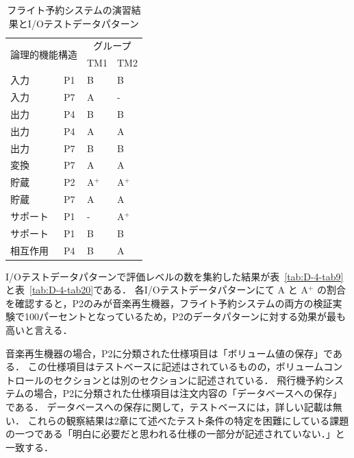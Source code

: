 \begin{table}[htbp]
\centering
  \caption{フライト予約システムの演習結果とI/Oテストデータパターン}
    \begin{tabular}{|l|l|l|l|}
    \hline
    \multicolumn{2}{|c|}{\multirow{2}[4]{*}{論理的機能構造}} & \multicolumn{2}{c|}{グループ} \bigstrut\\
\cline{3-4}    \multicolumn{2}{|c|}{} & TM1   & TM2 \bigstrut\\
    \hline
    \hline
    入力    & P1    & B     & B \bigstrut\\
    \hline
    入力    & P7    & A     & - \bigstrut\\
    \hline
    出力    & P4    & B     & B \bigstrut\\
    \hline
    出力    & P4    & A     & A \bigstrut\\
    \hline
    出力    & P7    & B     & B \bigstrut\\
    \hline
    変換    & P7    & A     & A \bigstrut\\
    \hline
    貯蔵    & P2    & A${}^\text{+}$     & A${}^\text{+}$  \bigstrut\\
    \hline
    貯蔵    & P7    & A     & A \bigstrut\\
    \hline
    サポート  & P1    & -     & A${}^\text{+}$  \bigstrut\\
    \hline
    サポート  & P1    & B     & B \bigstrut\\
    \hline
    相互作用  & P4    & B     & A \bigstrut\\
    \hline
    \end{tabular}%
\label{tab:D-4-tab8}%
\end{table}%


I/Oテストデータパターンで評価レベルの数を集約した結果が表~\ref{tab:D-4-tab9}と表~\ref{tab:D-4-tab20}である．
各I/Oテストデータパターンにて A と A${}^\text{+}$ の割合を確認すると，P2のみが音楽再生機器，フライト予約システムの両方の検証実験で100パーセントとなっているため，P2のデータパターンに対する効果が最も高いと言える．

音楽再生機器の場合，P2に分類された仕様項目は「ボリューム値の保存」である．
この仕様項目はテストベースに記述はされているものの，ボリュームコントロールのセクションとは別のセクションに記述されている．
飛行機予約システムの場合，P2に分類された仕様項目は注文内容の「データベースへの保存」である．
データベースへの保存に関して，テストベースには，詳しい記載は無い．
これらの観察結果は2章にて述べたテスト条件の特定を困難にしている課題の一つである「明白に必要だと思われる仕様の一部分が記述されていない．」と一致する．

